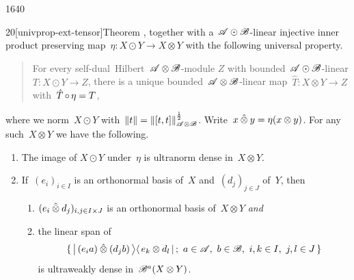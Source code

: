 \begin{parsec}{1640}
\begin{point}{20}[univprop-ext-tensor]{Theorem}
    ,
    together with a~$\mathscr{A} \odot \mathscr{B}$-linear injective
    inner product preserving map~$\eta \colon X \odot Y \to X\otimes Y$
    with the following universal property.
    \begin{quote}
    For every self-dual~Hilbert~$\mathscr{A}\otimes\mathscr{B}$-module
    $Z$ with bounded~$\mathscr{A} \odot \mathscr{B}$-linear
        $T\colon X \odot Y \to Z$,
    there is a unique bounded~$\mathscr{A} \otimes \mathscr{B}$-linear
        map~$\hat{T}\colon X \otimes Y \to Z$
    with~$\hat{T} \mathop{\circ} \eta= T$,
    \end{quote}
where we norm~$X \odot Y$ with~$\|t \| = \|[t,t]\|^{\frac{1}{2}}_{\mathscr{A}\otimes \mathscr{B}}$.
Write~$x \mathbin{\hat{\otimes}} y = \eta(x\otimes y)$.
For any such~$X \otimes Y$ we have the following.
\begin{enumerate}
    \item The image of $X \odot Y$ under~$\eta$ is ultranorm dense in~$X \otimes Y$.
    \item If~$(e_i)_{i \in I}$ is an orthonormal basis of~$X$
                and~$(d_j)_{j \in J}$ of~$Y$,
                then
        \begin{enumerate}
            \item $(e_i \mathbin{\hat{\otimes}} d_j)_{i,j\in I\times J}$
                is an orthonormal basis of~$X \otimes Y$ \emph{and}
            \item
                the linear span of
                \begin{equation*}
                    \{\, \ketbra{\,(e_i a) \hotimes (d_j b) \,}{\,
                        e_{k}\otimes d_{l} \,}; \ 
                        a \in \scrA, \ 
                        b \in \scrB,\ 
                        i,k \in I,\ 
                        j,l \in J \,
                    \} 
                \end{equation*}
                is ultraweakly dense in~$\mathscr{B}^a(X \otimes Y)$.
        \end{enumerate}
                

\end{enumerate}
\end{point}
\end{parsec}
